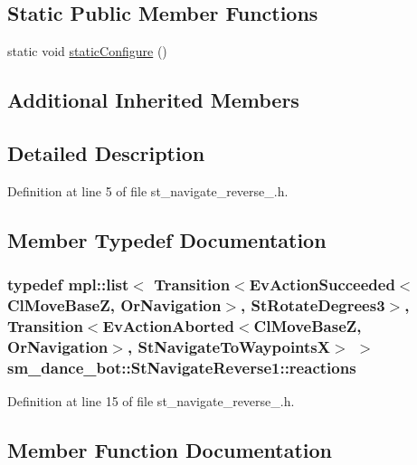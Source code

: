 \subsection*{Static Public Member Functions}
\begin{DoxyCompactItemize}
\item 
static void \hyperlink{structsm__dance__bot_1_1StNavigateReverse1_a27ad6ec4e54e4b4acc676fdb3948849e}{static\+Configure} ()
\end{DoxyCompactItemize}
\subsection*{Additional Inherited Members}


\subsection{Detailed Description}


Definition at line 5 of file st\+\_\+navigate\+\_\+reverse\+\_.\+h.



\subsection{Member Typedef Documentation}
\subsubsection[{\texorpdfstring{reactions}{reactions}}]{\setlength{\rightskip}{0pt plus 5cm}typedef mpl\+::list$<$ Transition$<$Ev\+Action\+Succeeded$<${\bf Cl\+Move\+BaseZ}, {\bf Or\+Navigation}$>$, {\bf St\+Rotate\+Degrees3}$>$, Transition$<$Ev\+Action\+Aborted$<${\bf Cl\+Move\+BaseZ}, {\bf Or\+Navigation}$>$, {\bf St\+Navigate\+To\+WaypointsX}$>$ $>$ {\bf sm\+\_\+dance\+\_\+bot\+::\+St\+Navigate\+Reverse1\+::reactions}}\hypertarget{structsm__dance__bot_1_1StNavigateReverse1_ab71f3a9d0c89ec34654dbffdcbc61c67}{}\label{structsm__dance__bot_1_1StNavigateReverse1_ab71f3a9d0c89ec34654dbffdcbc61c67}


Definition at line 15 of file st\+\_\+navigate\+\_\+reverse\+\_.\+h.



\subsection{Member Function Documentation}
